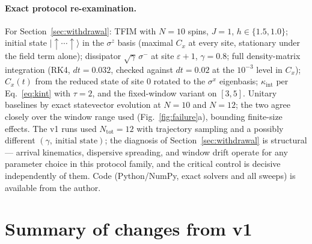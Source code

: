 \documentclass[11pt,a4paper]{article}
\theoremstyle{remark}
\newcommand{\eps}{\varepsilon}
\begin{document}
\paragraph{Exact protocol re-examination.}
For Section~\ref{sec:withdrawal}: TFIM with $N = 10$ spins, $J=1$, $h \in \{1.5, 1.0\}$;
initial state $\lvert{\uparrow}\cdots{\uparrow}\rangle$ in the $\sigma^z$ basis (maximal
$C_x$ at every site, stationary under the field term alone); dissipator
$\sqrt{\gamma}\,\sigma^-$ at site $\eps{+}1$, $\gamma = 0.8$; full density-matrix
integration (RK4, $dt = 0.032$, checked against $dt = 0.02$ at the $10^{-3}$ level in
$C_x$); $C_x(t)$ from the reduced state of site $0$ rotated to the $\sigma^x$ eigenbasis;
$\kappa_{\mathrm{int}}$ per Eq.~\eqref{eq:kint} with $\tau = 2$, and the fixed-window
variant on $[3,5]$. Unitary baselines by exact statevector evolution at $N = 10$ and
$N = 12$; the two agree closely over the window range used (Fig.~\ref{fig:failure}a),
bounding finite-size effects. The v1 runs used $N_{\mathrm{tot}} = 12$ with trajectory
sampling and a possibly different $(\gamma,\ \text{initial state})$; the diagnosis of
Section~\ref{sec:withdrawal} is structural --- arrival kinematics, dispersive spreading,
and window drift operate for any parameter choice in this protocol family, and the
critical control is decisive independently of them. Code (Python/NumPy, exact solvers
and all sweeps) is available from the author.

\section{Summary of changes from v1}
\label{app:changes}
\end{document}

